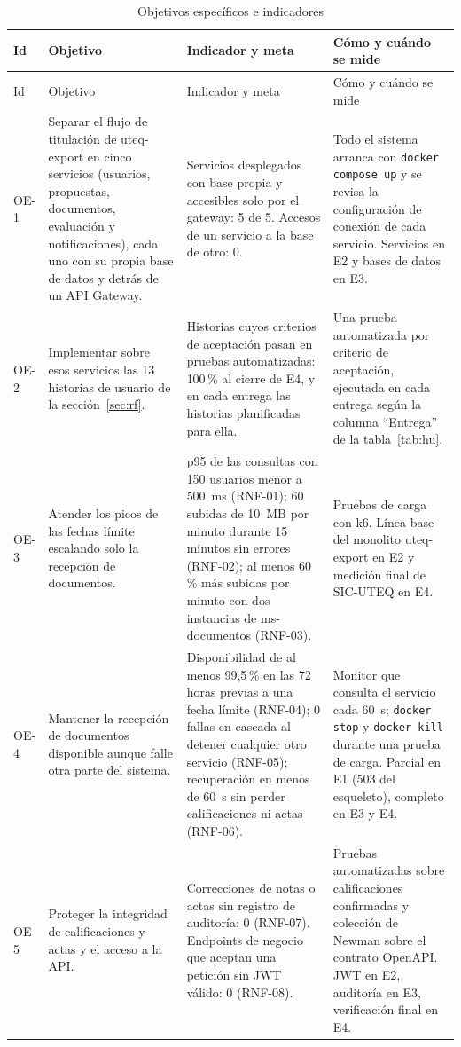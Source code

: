 \begingroup
\footnotesize
\setlength{\tabcolsep}{3pt}
\begin{longtable}{@{}L{0.9cm}L{4.5cm}L{5.0cm}L{4.6cm}@{}}
\caption{Objetivos específicos e indicadores}\label{tab:objetivos}\\
\toprule
Id & Objetivo & Indicador y meta & Cómo y cuándo se mide \\
\midrule
\endfirsthead
\toprule
Id & Objetivo & Indicador y meta & Cómo y cuándo se mide \\
\midrule
\endhead
\endfoot
\bottomrule
\endlastfoot
OE-1 & Separar el flujo de titulación de uteq-export en cinco servicios (usuarios, propuestas, documentos, evaluación y notificaciones), cada uno con su propia base de datos y detrás de un API Gateway. & Servicios desplegados con base propia y accesibles solo por el gateway: 5 de 5. Accesos de un servicio a la base de otro: 0. & Todo el sistema arranca con \texttt{docker compose up} y se revisa la configuración de conexión de cada servicio. Servicios en E2 y bases de datos en E3. \\
\midrule
OE-2 & Implementar sobre esos servicios las 13 historias de usuario de la sección~\ref{sec:rf}. & Historias cuyos criterios de aceptación pasan en pruebas automatizadas: 100\,\% al cierre de E4, y en cada entrega las historias planificadas para ella. & Una prueba automatizada por criterio de aceptación, ejecutada en cada entrega según la columna \enquote{Entrega} de la tabla~\ref{tab:hu}. \\
\midrule
OE-3 & Atender los picos de las fechas límite escalando solo la recepción de documentos. & p95 de las consultas con 150 usuarios menor a 500~ms (RNF-01); 60 subidas de 10~MB por minuto durante 15 minutos sin errores (RNF-02); al menos 60\,\% más subidas por minuto con dos instancias de ms-documentos (RNF-03). & Pruebas de carga con k6. Línea base del monolito uteq-export en E2 y medición final de SIC-UTEQ en E4. \\
\midrule
OE-4 & Mantener la recepción de documentos disponible aunque falle otra parte del sistema. & Disponibilidad de al menos 99,5\,\% en las 72 horas previas a una fecha límite (RNF-04); 0 fallas en cascada al detener cualquier otro servicio (RNF-05); recuperación en menos de 60~s sin perder calificaciones ni actas (RNF-06). & Monitor que consulta el servicio cada 60~s; \texttt{docker stop} y \texttt{docker kill} durante una prueba de carga. Parcial en E1 (503 del esqueleto), completo en E3 y E4. \\
\midrule
OE-5 & Proteger la integridad de calificaciones y actas y el acceso a la API. & Correcciones de notas o actas sin registro de auditoría: 0 (RNF-07). Endpoints de negocio que aceptan una petición sin JWT válido: 0 (RNF-08). & Pruebas automatizadas sobre calificaciones confirmadas y colección de Newman sobre el contrato OpenAPI. JWT en E2, auditoría en E3, verificación final en E4. \\
\end{longtable}
\endgroup

